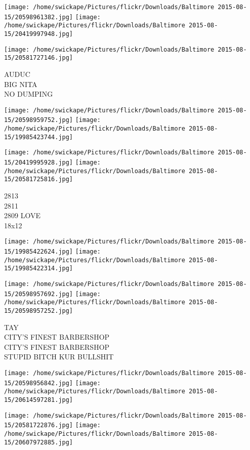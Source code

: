 \documentclass[10pt,letterpaper]{article}
\begin{document}
\texttt{[image: /home/swickape/Pictures/flickr/Downloads/Baltimore 2015-08-15/20598961382.jpg]}
\texttt{[image: /home/swickape/Pictures/flickr/Downloads/Baltimore 2015-08-15/20419997948.jpg]}

\vspace{0.25in}
\texttt{[image: /home/swickape/Pictures/flickr/Downloads/Baltimore 2015-08-15/20581727146.jpg]}

AUDUC\\
BIG NITA\\
NO DUMPING
\pagebreak

\texttt{[image: /home/swickape/Pictures/flickr/Downloads/Baltimore 2015-08-15/20598959752.jpg]}
\texttt{[image: /home/swickape/Pictures/flickr/Downloads/Baltimore 2015-08-15/19985423744.jpg]}

\texttt{[image: /home/swickape/Pictures/flickr/Downloads/Baltimore 2015-08-15/20419995928.jpg]}
\texttt{[image: /home/swickape/Pictures/flickr/Downloads/Baltimore 2015-08-15/20581725816.jpg]}

2813\\
2811\\
2809 LOVE\\
18x12
\pagebreak

\texttt{[image: /home/swickape/Pictures/flickr/Downloads/Baltimore 2015-08-15/19985422624.jpg]}
\texttt{[image: /home/swickape/Pictures/flickr/Downloads/Baltimore 2015-08-15/19985422314.jpg]}

\texttt{[image: /home/swickape/Pictures/flickr/Downloads/Baltimore 2015-08-15/20598957692.jpg]}
\texttt{[image: /home/swickape/Pictures/flickr/Downloads/Baltimore 2015-08-15/20598957252.jpg]}

TAY\\
CITY'S FINEST BARBERSHOP\\
CITY'S FINEST BARBERSHOP\\
STUPID BITCH KUR BULLSHIT
\pagebreak

\texttt{[image: /home/swickape/Pictures/flickr/Downloads/Baltimore 2015-08-15/20598956842.jpg]}
\texttt{[image: /home/swickape/Pictures/flickr/Downloads/Baltimore 2015-08-15/20614597281.jpg]}

\texttt{[image: /home/swickape/Pictures/flickr/Downloads/Baltimore 2015-08-15/20581722876.jpg]}
\texttt{[image: /home/swickape/Pictures/flickr/Downloads/Baltimore 2015-08-15/20607972885.jpg]}
\end{document}
